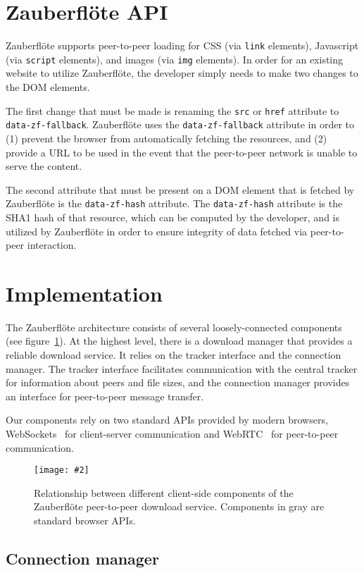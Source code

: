 \documentclass[letterpaper,twocolumn,10pt]{article}
\newcommand{\zbf}{Zauberfl\"{o}te\xspace}
\newcommand{\inclfigure}[3]{
    \begin{figure}
        \begin{centering}
            \texttt{[image: \#2]}
            \caption{#3}
            \label{#1}
        \end{centering}
    \end{figure}
}
\begin{document}
\section{\zbf API}

\zbf supports peer-to-peer loading for CSS (via \texttt{link} elements), Javascript (via \texttt{script} elements), and images (via \texttt{img} elements). In order for an existing website to utilize \zbf, the developer simply needs to make two changes to the DOM elements.

The first change that must be made is renaming the \texttt{src} or \texttt{href} attribute to  \texttt{data-zf-fallback}. \zbf uses the \texttt{data-zf-fallback} attribute in order to (1) prevent the browser from automatically fetching the resources, and (2) provide a URL to be used in the event that the peer-to-peer network is unable to serve the content.

The second attribute that must be present on a DOM element that is fetched by \zbf is the \texttt{data-zf-hash} attribute. The \texttt{data-zf-hash} attribute is the SHA1 hash of that resource, which can be computed by the developer, and is utilized by \zbf in order to ensure integrity of data fetched via peer-to-peer interaction.

\section{Implementation}

The \zbf architecture consists of several loosely-connected components (see
figure~\ref{fig:components}). At the highest level, there is a download manager that
provides a reliable download service. It relies on the tracker interface and
the connection manager. The tracker interface facilitates communication with
the central tracker for information about peers and file sizes, and the
connection manager provides an interface for peer-to-peer message transfer.

Our components rely on two standard APIs provided by modern browsers,
WebSockets~\cite{w3c:websocket} for client-server communication and
WebRTC~\cite{w3c:webrtc} for peer-to-peer communication.

\inclfigure{fig:components}{components.pdf}{
    Relationship between different client-side components of the \zbf
    peer-to-peer download service. Components in gray are standard browser
    APIs.
}

\subsection{Connection manager}
\end{document}
